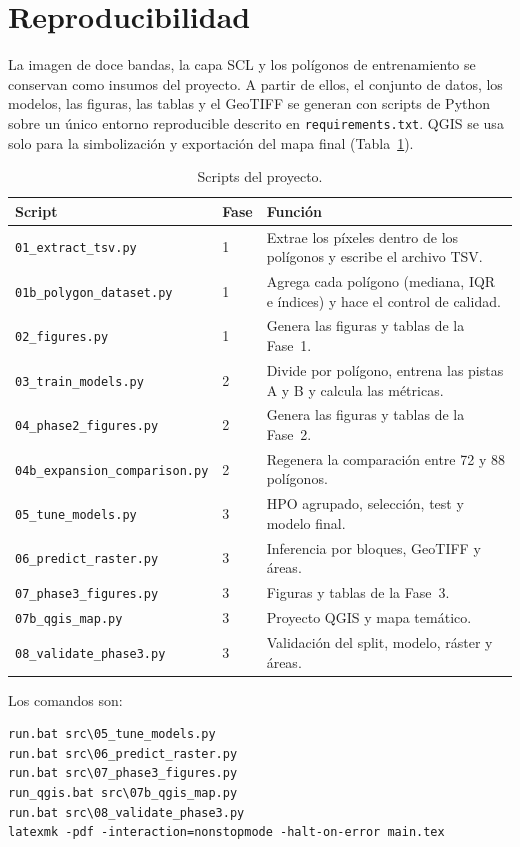 \documentclass{article}
\begin{document}
\section{Reproducibilidad}
La imagen de doce bandas, la capa SCL y los polígonos de entrenamiento se conservan como insumos del proyecto. A partir de ellos, el conjunto de datos, los modelos, las figuras, las tablas y el GeoTIFF se generan con scripts de Python sobre un único entorno reproducible descrito en \texttt{requirements.txt}. QGIS se usa solo para la simbolización y exportación del mapa final (Tabla~\ref{tab:scripts}).

\begin{table}[htbp]
 \centering
 \caption{Scripts del proyecto.}
 \label{tab:scripts}
 \begin{tabularx}{\textwidth}{llX}
  \toprule
  Script & Fase & Función \\
  \midrule
  \texttt{01\_extract\_tsv.py} & 1 & Extrae los píxeles dentro de los polígonos y escribe el archivo TSV. \\
  \texttt{01b\_polygon\_dataset.py} & 1 & Agrega cada polígono (mediana, IQR e índices) y hace el control de calidad. \\
  \texttt{02\_figures.py} & 1 & Genera las figuras y tablas de la Fase~1. \\
  \texttt{03\_train\_models.py} & 2 & Divide por polígono, entrena las pistas A y B y calcula las métricas. \\
  \texttt{04\_phase2\_figures.py} & 2 & Genera las figuras y tablas de la Fase~2. \\
  \texttt{04b\_expansion\_comparison.py} & 2 & Regenera la comparación entre 72 y 88 polígonos. \\
  \texttt{05\_tune\_models.py} & 3 & HPO agrupado, selección, test y modelo final. \\
  \texttt{06\_predict\_raster.py} & 3 & Inferencia por bloques, GeoTIFF y áreas. \\
  \texttt{07\_phase3\_figures.py} & 3 & Figuras y tablas de la Fase~3. \\
  \texttt{07b\_qgis\_map.py} & 3 & Proyecto QGIS y mapa temático. \\
  \texttt{08\_validate\_phase3.py} & 3 & Validación del split, modelo, ráster y áreas. \\
  \bottomrule
 \end{tabularx}
\end{table}

Los comandos son:

\begin{verbatim}
run.bat src\05_tune_models.py
run.bat src\06_predict_raster.py
run.bat src\07_phase3_figures.py
run_qgis.bat src\07b_qgis_map.py
run.bat src\08_validate_phase3.py
latexmk -pdf -interaction=nonstopmode -halt-on-error main.tex
\end{verbatim}
\end{document}
